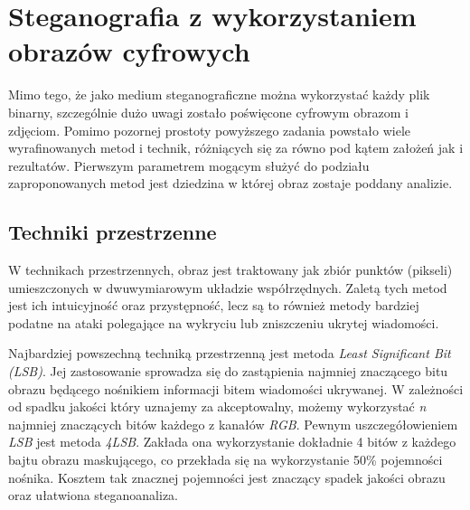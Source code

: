 {    \section{Steganografia z wykorzystaniem obrazów cyfrowych}
    {
        Mimo tego, że jako medium steganograficzne można wykorzystać każdy plik binarny, szczególnie dużo uwagi zostało
        poświęcone cyfrowym obrazom i zdjęciom. Pomimo pozornej prostoty powyższego zadania powstało wiele
        wyrafinowanych metod i technik, różniących się za równo pod kątem założeń jak i rezultatów. Pierwszym parametrem
        mogącym służyć do podziału zaproponowanych metod jest dziedzina w której  obraz zostaje poddany analizie. 

        \subsection{Techniki przestrzenne}
        {
            W technikach przestrzennych, obraz jest traktowany jak zbiór punktów (pikseli) umieszczonych w dwuwymiarowym
            układzie współrzędnych. Zaletą tych metod jest ich intuicyjność oraz przystępność, lecz są to również metody
            bardziej podatne na ataki polegające na wykryciu lub zniszczeniu ukrytej wiadomości\cite{Sharma2020AnIS}.

            Najbardziej powszechną techniką przestrzenną jest metoda \textit{Least Significant Bit (LSB)}. Jej
            zastosowanie  sprowadza się do zastąpienia najmniej znaczącego bitu obrazu będącego nośnikiem informacji
            bitem wiadomości  ukrywanej. W zależności od spadku jakości który uznajemy za akceptowalny, możemy
            wykorzystać \textit{n} najmniej  znaczących bitów każdego z kanałów \textit{RGB}. Pewnym uszczegółowieniem
            \textit{LSB} jest metoda  \textit{4LSB}. Zakłada ona wykorzystanie dokładnie 4 bitów z każdego bajtu obrazu
            maskującego, co przekłada się  na wykorzystanie 50\% pojemności nośnika. Kosztem tak znacznej pojemności
            jest znaczący spadek jakości obrazu  oraz ułatwiona steganoanaliza.

}}}
